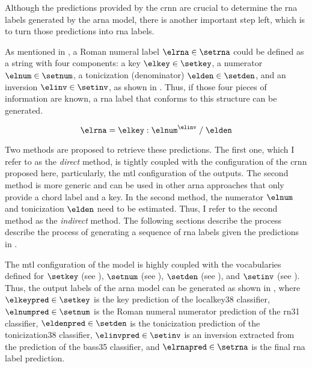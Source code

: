 
Although the predictions provided by the \gls{crnn} are
crucial to determine the \gls{rna} labels generated by the
\gls{arna} model, there is another important step left,
which is to turn those predictions into \gls{rna} labels.

As mentioned in
, a Roman
numeral label $\elrna \in \setrna$ could be defined as a
string with four components: a key $\elkey \in \setkey$, a
numerator $\elnum \in \setnum$, a tonicization (denominator)
$\elden \in \setden$, and an inversion $\elinv \in \setinv$,
as shown in . Thus, if those four pieces of
information are known, a \gls{rna} label that conforms to
this structure can be generated.

\begin{equation}
    \label{eq:rna}
    \elrna = \elkey : \elnum^{\elinv} \; / \; \elden
\end{equation}

Two methods are proposed to retrieve these predictions. The
first one, which I refer to as the \emph{direct} method, is
tightly coupled with the configuration of the \gls{crnn}
proposed here, particularly, the \gls{mtl} configuration of
the outputs. The second method is more generic and can be
used in other \gls{arna} approaches that only provide a
chord label and a key. In the second method, the numerator
$\elnum$ and tonicization $\elden$ need to be estimated.
Thus, I refer to the second method as the \emph{indirect}
method. The following sections describe the process describe
the process of generating a sequence of \gls{rna} labels
given the predictions in .


The \gls{mtl} configuration of the model is highly coupled
with the vocabularies defined for $\setkey$ (see
), $\setnum$ (see
), $\setden$
(see ), and
$\setinv$ (see
). Thus, the
output labels of the \gls{arna} model can be generated as
shown in , where $\elkeypred \in \setkey$ is
the key prediction of the \gls{localkey38} classifier,
$\elnumpred \in \setnum$ is the Roman numeral numerator
prediction of the \gls{rn31} classifier, $\eldenpred \in
\setden$ is the tonicization prediction of the
\gls{tonicization38} classifier, $\elinvpred \in \setinv$ is
an inversion extracted from the prediction of the
\gls{bass35} classifier, and $\elrnapred \in \setrna$ is the
final \gls{rna} label prediction.

